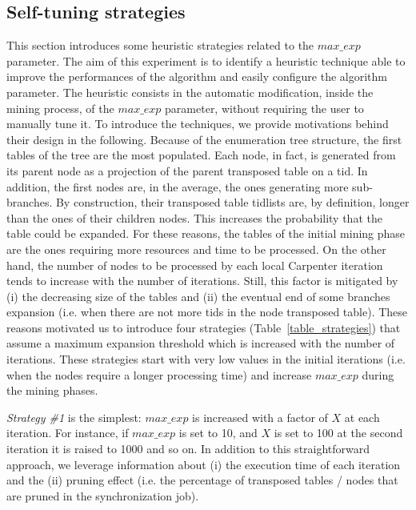\subsection{Self-tuning strategies}\label{exp_strategies}

This section introduces some heuristic strategies related to the $max\_exp$ parameter.
The aim of this experiment is to identify a heuristic technique 
able to improve the performances of the algorithm and easily configure the algorithm parameter. The heuristic consists in the automatic modification, inside the mining process, of the $max\_exp$ parameter,
without requiring the user to manually tune it.
To introduce the techniques, we provide motivations behind their design in the following.
Because of the enumeration tree structure, the first tables of the tree are the most populated. Each node, in fact, is generated from its parent node as a projection of the parent transposed table on a tid.
In addition, the first nodes are, in the average, the ones generating more sub-branches. By construction, their transposed table tidlists are, by definition, longer than the ones of their children nodes. This increases the probability that the table could be expanded.
For these reasons, the tables of the initial mining phase are the ones requiring more resources and time to be processed.
On the other hand, the number of nodes to be processed by each local Carpenter iteration tends to increase with the number of iterations. Still, this factor is mitigated by (i) the decreasing size of the tables and (ii) the eventual end of some branches expansion (i.e. when there are not more tids in the node transposed table).
These reasons motivated us to introduce four strategies (Table~\ref{table_strategies}) that assume a maximum expansion threshold which is increased with the number of iterations. These strategies start with very low values in the initial iterations  (i.e. when the nodes require a longer processing time) and increase $max\_exp$ during the mining phases.

\textit{Strategy \#1} is the simplest: $max\_exp$ is increased with a factor of $X$ at each iteration. For instance, if $max\_exp$ is set to 10, and $X$ is set to 100 at the second iteration it is raised to 1000 and so on.
In addition to this straightforward approach, we leverage information about (i) the execution time of each iteration and the (ii) pruning effect (i.e. the percentage of transposed tables / nodes that are pruned in the synchronization job).

